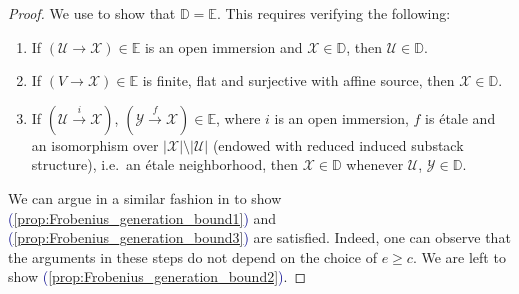 \documentclass[11pt]{amsart}
\def\eqref#1{\textcolor{darkblue}{(\ref{#1})}}
\theoremstyle{plain}
\theoremstyle{definition}
\numberwithin{equation}{section}
\numberwithin{theorem}{section}
\begin{document}
\begin{proof}
    We use \cite[Theorem E]{Hall/Rydh:2018} to show that $\mathbb{D}=\mathbb{E}$. 
    This requires verifying the following:
    \begin{enumerate}
        \item \label{prop:Frobenius_generation_bound1} If $(\mathcal{U} \to \mathcal{X})\in\mathbb{E}$ is an open immersion and $\mathcal{X}\in\mathbb{D}$, then $\mathcal{U}\in\mathbb{D}$.
        \item \label{prop:Frobenius_generation_bound2} If $(V \to \mathcal{X})\in \mathbb{E}$ is finite, flat and surjective with affine source, then $\mathcal{X}\in\mathbb{D}$.
        \item \label{prop:Frobenius_generation_bound3} If $(\mathcal{U} \xrightarrow{i} \mathcal{X})$, $(\mathcal{Y} \xrightarrow{f} \mathcal{X})\in\mathbb{E}$, where $i$ is an open immersion, $f$ is \'{e}tale and an isomorphism over $|\mathcal{X}|\setminus |\mathcal{U}|$ (endowed with reduced induced substack structure), i.e.\ an \'{e}tale neighborhood, then $\mathcal{X}\in \mathbb{D}$ whenever $\mathcal{U}$, $\mathcal{Y}\in\mathbb{D}$.
    \end{enumerate}
    We can argue in a similar fashion in  to show \eqref{prop:Frobenius_generation_bound1} and \eqref{prop:Frobenius_generation_bound3} are satisfied. 
    Indeed, one can observe that the arguments in these steps do not depend on the choice of $e\geq c$. 
    We are left to show \eqref{prop:Frobenius_generation_bound2}. 


\end{proof}
\end{document}
